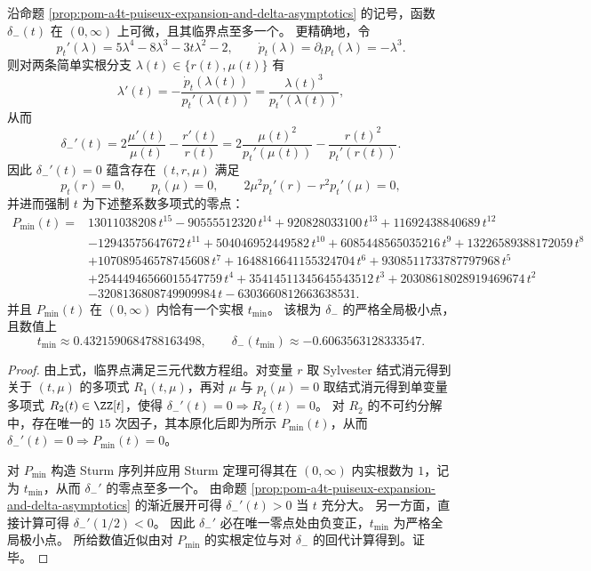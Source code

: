 \begin{theorem}[负实通道偏移的唯一全局极小点与驻点证书多项式]\label{thm:pom-a4t-delta-minus-unique-global-minimizer}
沿命题 \ref{prop:pom-a4t-puiseux-expansion-and-delta-asymptotics} 的记号，函数 \(\delta_{-}(t)\) 在 \((0,\infty)\) 上可微，且其临界点至多一个。
更精确地，令
\[
p_t'(\lambda)=5\lambda^4-8\lambda^3-3t\lambda^2-2,\qquad
\dot p_t(\lambda)=\partial_t p_t(\lambda)=-\lambda^3.
\]
则对两条简单实根分支 \(\lambda(t)\in\{r(t),\mu(t)\}\) 有
\[
\lambda'(t)=-\frac{\dot p_t(\lambda(t))}{p_t'(\lambda(t))}=\frac{\lambda(t)^3}{p_t'(\lambda(t))},
\]
从而
\[
\delta_{-}'(t)=2\frac{\mu'(t)}{\mu(t)}-\frac{r'(t)}{r(t)}
=
2\frac{\mu(t)^2}{p_t'(\mu(t))}-\frac{r(t)^2}{p_t'(r(t))}.
\]
因此 \(\delta_{-}'(t)=0\) 蕴含存在 \((t,r,\mu)\) 满足
\[
p_t(r)=0,\qquad p_t(\mu)=0,\qquad 2\mu^2p_t'(r)-r^2p_t'(\mu)=0,
\]
并进而强制 \(t\) 为下述整系数多项式的零点：
\[
\begin{aligned}
P_{\min}(t)={}&13011038208\,t^{15}-90555512320\,t^{14}+920828033100\,t^{13}+11692438840689\,t^{12}\\
&-12943575647672\,t^{11}+504046952449582\,t^{10}+6085448565035216\,t^{9}+13226589388172059\,t^{8}\\
&+107089546578745608\,t^{7}+1648816641155324704\,t^{6}+9308511733787797968\,t^{5}\\
&+25444946566015547759\,t^{4}+35414511345645543512\,t^{3}+20308618028919469674\,t^{2}\\
&-3208136808749909984\,t-6303660812663638531.
\end{aligned}
\]
并且 \(P_{\min}(t)\) 在 \((0,\infty)\) 内恰有一个实根 \(t_{\min}\)。
该根为 \(\delta_{-}\) 的严格全局极小点，且数值上
\[
t_{\min}\approx 0.4321590684788163498,
\qquad
\delta_{-}(t_{\min})\approx -0.6063563128333547.
\]
\end{theorem}
\begin{proof}
由上式，临界点满足三元代数方程组。对变量 \(r\) 取 Sylvester 结式消元得到关于 \((t,\mu)\) 的多项式 \(R_1(t,\mu)\)，再对 \(\mu\) 与 \(p_t(\mu)=0\) 取结式消元得到单变量多项式 \(R_2(t)\in\ZZ[t]\)，使得 \(\delta_{-}'(t)=0\Rightarrow R_2(t)=0\)。
对 \(R_2\) 的不可约分解中，存在唯一的 \(15\) 次因子，其本原化后即为所示 \(P_{\min}(t)\)，从而 \(\delta_{-}'(t)=0\Rightarrow P_{\min}(t)=0\)。
\par
对 \(P_{\min}\) 构造 Sturm 序列并应用 Sturm 定理可得其在 \((0,\infty)\) 内实根数为 \(1\)，记为 \(t_{\min}\)，从而 \(\delta_{-}'\) 的零点至多一个。
由命题 \ref{prop:pom-a4t-puiseux-expansion-and-delta-asymptotics} 的渐近展开可得 \(\delta_{-}'(t)>0\) 当 \(t\) 充分大。
另一方面，直接计算可得 \(\delta_{-}'(1/2)<0\)。
因此 \(\delta_{-}'\) 必在唯一零点处由负变正，\(t_{\min}\) 为严格全局极小点。
所给数值近似由对 \(P_{\min}\) 的实根定位与对 \(\delta_{-}\) 的回代计算得到。证毕。
\end{proof}

